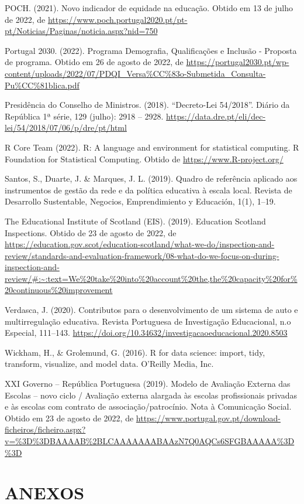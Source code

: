 \documentclass[
]{book}
\begin{document}
POCH. (2021). Novo indicador de equidade na educação. Obtido em 13 de julho de 2022, de \url{https://www.poch.portugal2020.pt/pt-pt/Noticias/Paginas/noticia.aspx?nid=750}

Portugal 2030. (2022). Programa Demografia, Qualificações e Inclusão - Proposta de programa. Obtido em 26 de agosto de 2022, de \url{https://portugal2030.pt/wp-content/uploads/2022/07/PDQI_Versa\%CC\%83o-Submetida_Consulta-Pu\%CC\%81blica.pdf}

Presidência do Conselho de Ministros. (2018). ``Decreto-Lei 54/2018''. Diário da República 1ª série, 129 (julho): 2918 -- 2928. \url{https://data.dre.pt/eli/dec-lei/54/2018/07/06/p/dre/pt/html}

R Core Team (2022). R: A language and environment for statistical computing. R Foundation for Statistical Computing. Obtido de \url{https://www.R-project.org/}

Santos, S., Duarte, J. \& Marques, J. L. (2019). Quadro de referência aplicado aos instrumentos de gestão da rede e da política educativa à escala local. Revista de Desarrollo Sustentable, Negocios, Emprendimiento y Educación, 1(1), 1--19.

The Educational Institute of Scotland (EIS). (2019). Education Scotland Inspections. Obtido de 23 de agosto de 2022, de \url{https://education.gov.scot/education-scotland/what-we-do/inspection-and-review/standards-and-evaluation-framework/08-what-do-we-focus-on-during-inspection-and-review/\#:~:text=We\%20take\%20into\%20account\%20the,the\%20capacity\%20for\%20continuous\%20improvement}

Verdasca, J. (2020). Contributos para o desenvolvimento de um sistema de auto e multirregulação educativa. Revista Portuguesa de Investigação Educacional, n.o Especial, 111--143. \url{https://doi.org/10.34632/investigacaoeducacional.2020.8503}

Wickham, H., \& Grolemund, G. (2016). R for data science: import, tidy, transform, visualize, and model data. O'Reilly Media, Inc.~

XXI Governo -- República Portuguesa (2019). Modelo de Avaliação Externa das Escolas -- novo ciclo / Avaliação externa alargada às escolas profissionais privadas e às escolas com contrato de associação/patrocínio. Nota à Comunicação Social. Obtido em 23 de agosto de 2022, de \url{https://www.portugal.gov.pt/download-ficheiros/ficheiro.aspx?v=\%3D\%3DBAAAAB\%2BLCAAAAAAABAAzN7Q0AQCs6SFGBAAAAA\%3D\%3D}

\hypertarget{anexos}{%
\chapter*{\texorpdfstring{\textbf{ANEXOS}}{ANEXOS}}\label{anexos}}
\end{document}

